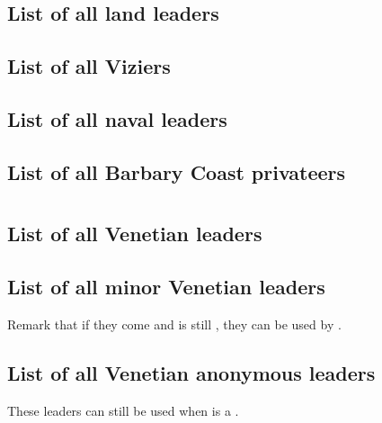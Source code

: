 \section{\paysmajeurTurquie}
\subsection{List of all land leaders}
\subsection{List of all Viziers}
\subsection{List of all naval leaders}
\subsection{List of all Barbary Coast privateers}
\list@anonyme

\section{\paysmajeurVenise}
\subsection{List of all Venetian leaders}
\subsection{List of all minor Venetian leaders}
\aparag Remark that if they come and \paysVenise is still \MAJ, they can be
used by \VEN.
\subsection{List of all Venetian anonymous leaders}
\aparag These leaders can still be used when \paysVenise is a \MIN.
\listanonymevenise

\makeatother


